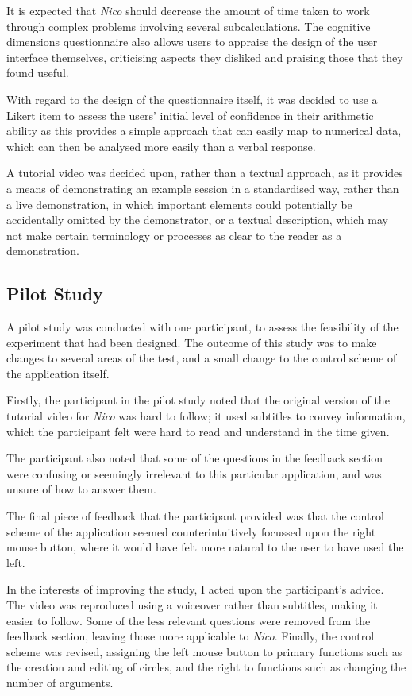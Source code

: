 \documentclass[12pt,twoside,notitlepage,xetex]{report}
\begin{document}
{It is expected that \emph{Nico} should decrease the amount of time taken to work through complex problems involving several subcalculations.  The cognitive dimensions questionnaire also allows users to appraise the design of the user interface themselves, criticising aspects they disliked and praising those that they found useful.

With regard to the design of the questionnaire itself, it was decided to use a Likert item to assess the users' initial level of confidence in their arithmetic ability as this provides a simple approach that can easily map to numerical data, which can then be analysed more easily than a verbal response.

A tutorial video was decided upon, rather than a textual approach, as it provides a means of demonstrating an example session in a standardised way, rather than a live demonstration, in which important elements could potentially be accidentally omitted by the demonstrator, or a textual description, which may not make certain terminology or processes as clear to the reader as a demonstration.

\subsection{Pilot Study}

A pilot study was conducted with one participant, to assess the feasibility of the experiment that had been designed.  The outcome of this study was to make changes to several areas of the test, and a small change to the control scheme of the application itself.

Firstly, the participant in the pilot study noted that the original version of the tutorial video for \emph{Nico} was hard to follow; it used subtitles to convey information, which the participant felt were hard to read and understand in the time given.

The participant also noted that some of the questions in the feedback section were confusing or seemingly irrelevant to this particular application, and was unsure of how to answer them.

The final piece of feedback that the participant provided was that the control scheme of the application seemed counterintuitively focussed upon the right mouse button, where it would have felt more natural to the user to have used the left.

In the interests of improving the study, I acted upon the participant's advice. The video was reproduced using a voiceover rather than subtitles, making it easier to follow.  Some of the less relevant questions were removed from the feedback section, leaving those more applicable to \emph{Nico}.  Finally, the control scheme was revised, assigning the left mouse button to primary functions such as the creation and editing of circles, and the right to functions such as changing the number of arguments.

}
\end{document}
